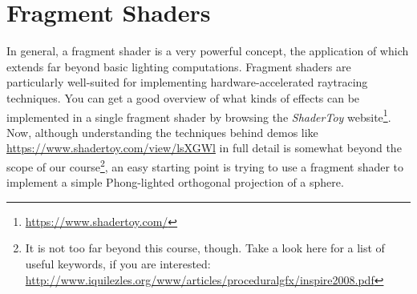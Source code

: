\documentclass{article}
\begin{document}
\section{Fragment Shaders}
In general, a fragment shader is a very powerful concept, the application of which extends far beyond basic lighting computations. Fragment shaders are particularly well-suited for implementing hardware-accelerated raytracing techniques. You can get a good overview of what kinds of effects can be implemented in a single fragment shader by browsing the \emph{ShaderToy} website\footnote{\url{https://www.shadertoy.com/}}. Now, although understanding the techniques behind demos like \url{https://www.shadertoy.com/view/lsXGWl} in full detail is somewhat beyond the scope of our course\footnote{It is not too far beyond this course, though. Take a look here for a list of useful keywords, if you are interested: \url{http://www.iquilezles.org/www/articles/proceduralgfx/inspire2008.pdf}}, an easy starting point is trying to use a fragment shader to implement a simple Phong-lighted orthogonal projection of a sphere.
\end{document}
